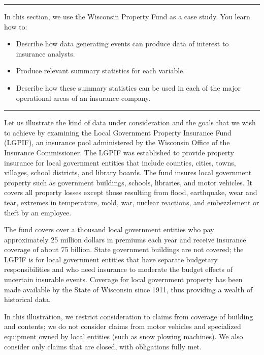 \documentclass[
]{book}
\providecommand{\tightlist}{%
  \setlength{\itemsep}{0pt}\setlength{\parskip}{0pt}}
\begin{document}
\begin{center}\rule{0.5\linewidth}{0.5pt}\end{center}

In this section, we use the Wisconsin Property Fund as a case study. You learn how to:

\begin{itemize}
\tightlist
\item
  Describe how data generating events can produce data of interest to insurance analysts.
\item
  Produce relevant summary statistics for each variable.
\item
  Describe how these summary statistics can be used in each of the major operational areas of an insurance company.
\end{itemize}

\begin{center}\rule{0.5\linewidth}{0.5pt}\end{center}

Let us illustrate the kind of data under consideration and the goals that we wish to achieve by examining the Local Government Property Insurance Fund (LGPIF), an insurance pool administered by the Wisconsin Office of the Insurance Commissioner. The LGPIF was established to provide property insurance for local government entities that include counties, cities, towns, villages, school districts, and library boards. The fund insures local government property such as government buildings, schools, libraries, and motor vehicles. It covers all property losses except those resulting from flood, earthquake, wear and tear, extremes in temperature, mold, war, nuclear reactions, and embezzlement or theft by an employee.

The fund covers over a thousand local government entities who pay approximately 25 million dollars in premiums each year and receive insurance coverage of about 75 billion. State government buildings are not covered; the LGPIF is for local government entities that have separate budgetary responsibilities and who need insurance to moderate the budget effects of uncertain insurable events. Coverage for local government property has been made available by the State of Wisconsin since 1911, thus providing a wealth of historical data.

In this illustration, we restrict consideration to claims from coverage of building and contents; we do not consider claims from motor vehicles and specialized equipment owned by local entities (such as snow plowing machines). We also consider only claims that are closed, with obligations fully met.
\end{document}
